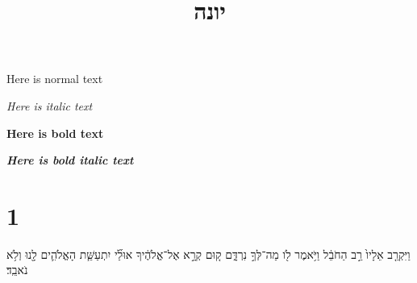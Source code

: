 \documentclass{openreader}
\title{יונה}
\date{}
\begin{document}
\maketitle
\raggedbottom 
\fontsize{16pt}{24pt}\selectfont

\begin{english}
Here is normal text

\textit{Here is italic text}

\textbf{Here is bold text}

\textit{\textbf{Here is bold italic text}}
\end{english}

\section*{1}
וַיִּקְרַ֤ב אֵלָיו֙ רַ֣ב הַחֹבֵ֔ל וַיֹּ֥אמֶר לֹ֖ו מַה־לְּךָ֣ נִרְדָּ֑ם ק֚וּם קְרָ֣א אֶל־אֱלֹהֶ֔יךָ אוּלַ֞י יִתְעַשֵּׁ֧ת הָאֱלֹהִ֛ים לָ֖נוּ וְלֹ֥א נֹאבֵֽד׃ 
\end{document}
